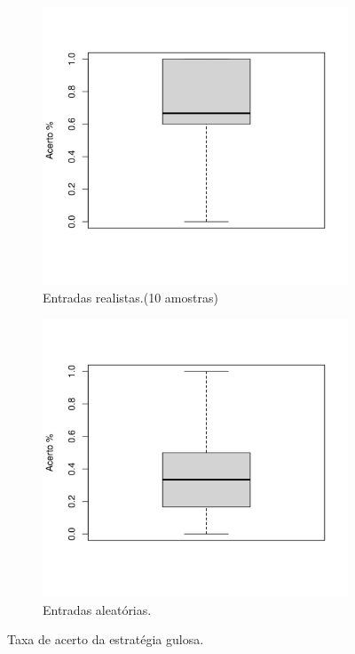 \documentclass[10.9pt]{article}
\begin{document}
\begin{center}
\begin{figure}
\begin{subfigure}[b]{.49\linewidth}
\centering
\includegraphics[width=\linewidth/2]{bar-greedy-ac-best}
\caption{Entradas realistas.(10 amostras)}\label{fig:bar-greedy-ac-best}
\end{subfigure}
\begin{subfigure}[b]{.49\linewidth}
\centering
\includegraphics[width=\linewidth/2]{bar-greedy-ac}
\caption{Entradas aleatórias.}\label{fig:bar-greedy-ac}
\end{subfigure}
\caption{Taxa de acerto da estratégia gulosa.}\label{fig:barplox-greedy}
\end{figure}
\end{center}
\end{document}
